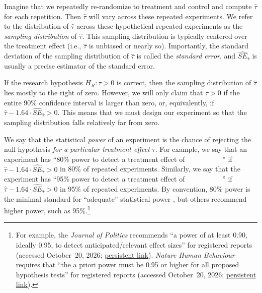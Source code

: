 \documentclass[12pt]{article}
\makeatletter
\def\pr@blank{~~~~~}
\DeclareRobustCommand{\underline}[1]{\def\pr@arg{#1}%
  \ifx\pr@arg\pr@blank\pr@underline{\hbox to 1.3\dimexpr\f@size pt\relax{}}\else\pr@underline{#1}\fi}
\makeatother
\begin{document}
Imagine that we repeatedly re-randomize to treatment and control and compute $\widehat{\tau}$ for each repetition.
Then $\widehat{\tau}$ will vary across these repeated experiments.
We refer to the distribution of $\widehat{\tau}$ across these hypothetical
repeated experiments as the \emph{sampling distribution} of $\widehat{\tau}$.
This sampling distribution is typically centered over the treatment effect (i.e., $\widehat{\tau}$ is unbiased or nearly so).
Importantly, the standard deviation of the sampling distribution of $\widehat{\tau}$ is called the \emph{standard error}, and ${\widehat{SE}}_{\widehat{\tau}}$ is usually a precise estimator of the standard error.

If the research hypothesis $H_{R}:\tau > 0$ is correct, then the sampling distribution of $\widehat{\tau}$ lies mostly to the right of zero.
However, we will only claim that $\tau > 0$ if the entire 90\% confidence interval is larger than zero, or, equivalently, if $\widehat{\tau} - 1.64 \cdot {\widehat{SE}}_{\widehat{\tau}} > 0$.
This means that we must design our experiment so that the sampling distribution falls relatively far from zero.

We say that the statistical \emph{power} of an experiment is the chance of rejecting the null hypothesis \emph{for a particular treatment effect} $\tau$.
For example, we say that an experiment has ``80\% power to detect a treatment effect of \underline{~~~~~}'' if
$\widehat{\tau} - 1.64 \cdot {\widehat{SE}}_{\widehat{\tau}} > 0$ in 80\% of repeated experiments.
Similarly, we say that the experiment has ``95\% power to detect a treatment effect of \underline{~~~~~}'' if $\widehat{\tau} - 1.64 \cdot {\widehat{SE}}_{\widehat{\tau}} > 0$ in 95\% of repeated experiments.
By convention, 80\% power is the minimal standard for ``adequate'' statistical power \citep[56]{Cohen1988}, but others recommend higher power, such as 95\%.\footnote{
  For example, the \textit{Journal of Politics} recommends ``a power of at least 0.90, ideally 0.95, to detect anticipated/relevant effect sizes'' for registered reports (accessed October~20, 2026; \href{https://web.archive.org/web/20250702024222/https://www.journals.uchicago.edu/journals/jop/registered-report-guidelines}{persistent link}).
  \textit{Nature Human Behaviour} requires that ``the a priori power must be 0.95 or higher for all proposed hypothesis tests'' for registered reports (accessed October~20, 2026; \href{https://web.archive.org/web/20261020192546/https://www.nature.com/nathumbehav/submission-guidelines/registeredreports}{persistent link}).
  }
\end{document}
